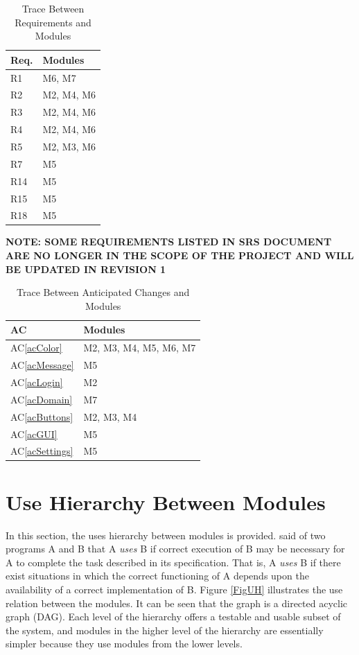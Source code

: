 \documentclass[12pt, titlepage]{article}
\newcommand{\acref}[1]{AC\ref{#1}}
\begin{document}
\begin{table}[H]
\centering
\begin{tabular}{p{} p{}}
\toprule
\textbf{Req.} & \textbf{Modules}\\
\midrule
R1 & M6, M7\\
R2 & M2, M4, M6\\
R3 & M2, M4, M6\\
R4 & M2, M4, M6\\
R5 & M2, M3, M6\\
R7 & M5\\
R14 & M5\\
R15 & M5\\
R18 & M5\\
\bottomrule
\end{tabular}
\caption{Trace Between Requirements and Modules}
\label{TblRT}
\end{table}

\textbf{NOTE: SOME REQUIREMENTS LISTED IN SRS DOCUMENT ARE NO LONGER IN THE SCOPE OF THE PROJECT AND WILL BE UPDATED IN REVISION 1}

\begin{table}[H]
\centering
\begin{tabular}{p{} p{}}
\toprule
\textbf{AC} & \textbf{Modules}\\
\midrule
\acref{acColor} & M2, M3, M4, M5, M6, M7\\
\acref{acMessage} & M5\\
\acref{acLogin} & M2\\
\acref{acDomain} & M7\\
\acref{acButtons} & M2, M3, M4\\
\acref{acGUI} & M5\\
\acref{acSettings} & M5\\
\bottomrule
\end{tabular}
\caption{Trace Between Anticipated Changes and Modules}
\label{TblACT}
\end{table}

\section{Use Hierarchy Between Modules} \label{SecUse}

In this section, the uses hierarchy between modules is
provided. \citet{Parnas1978} said of two programs A and B that A {\em uses} B if
correct execution of B may be necessary for A to complete the task described in
its specification. That is, A {\em uses} B if there exist situations in which
the correct functioning of A depends upon the availability of a correct
implementation of B.  Figure \ref{FigUH} illustrates the use relation between
the modules. It can be seen that the graph is a directed acyclic graph
(DAG). Each level of the hierarchy offers a testable and usable subset of the
system, and modules in the higher level of the hierarchy are essentially simpler
because they use modules from the lower levels.
\end{document}
